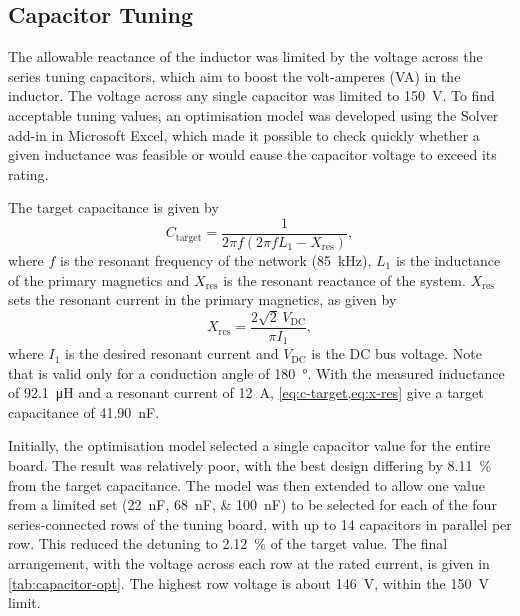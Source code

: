 \subsection{Capacitor Tuning}
\label{sec:capacitor-tuning}

The allowable reactance of the inductor was limited by the voltage across the
series tuning capacitors, which aim to boost the volt-amperes (VA) in the inductor.
The voltage across any single capacitor was limited to \SI{150}{\volt}. To find
acceptable tuning values, an optimisation model was developed using the Solver
add-in in Microsoft Excel, which made it possible to check quickly whether a
given inductance was feasible or would cause the capacitor voltage to exceed its
rating.

The target capacitance is given by
\begin{equation}
  C_{\mathrm{target}} = \frac{1}{2\pi f \left(2\pi f L_{1} - X_{\mathrm{res}}\right)},
  \label{eq:c-target}
\end{equation}
where $f$ is the resonant frequency of the network (\SI{85}{\kilo\hertz}),
$L_{1}$ is the inductance of the primary magnetics and $X_{\mathrm{res}}$ is the
resonant reactance of the system. $X_{\mathrm{res}}$ sets the resonant current in
the primary magnetics, as given by
\begin{equation}
  X_{\mathrm{res}} = \frac{2\sqrt{2}\, V_{\mathrm{DC}}}{\pi I_{1}},
  \label{eq:x-res}
\end{equation}
where $I_{1}$ is the desired resonant current and $V_{\mathrm{DC}}$ is the DC bus
voltage. Note that  is valid only for a conduction
angle of \SI{180}{\degree}. With the measured inductance of \SI{92.1}{\micro\henry} and a resonant current of
\SI{12}{\ampere}, \cref{eq:c-target,eq:x-res} give a target capacitance of
\SI{41.90}{\nano\farad}.

Initially, the optimisation model selected a single capacitor value for the
entire board. The result was relatively poor, with the best design differing by
\SI{8.11}{\percent} from the target capacitance. The model was then extended to
allow one value from a limited set (\SIlist{22;68;100}{\nano\farad}) to be
selected for each of the four series-connected rows of the tuning board, with up
to 14 capacitors in parallel per row. This reduced the detuning to
\SI{2.12}{\percent} of the target value. The final arrangement, with the voltage
across each row at the rated current, is given in \cref{tab:capacitor-opt}. The
highest row voltage is about \SI{146}{\volt}, within the \SI{150}{\volt} limit.

